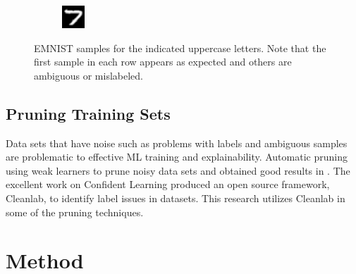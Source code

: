 \documentclass[conference]{IEEEtran}
\begin{document}
\begin{figure}[h]
\begin{subfigure}{.10\textwidth}
        \label{fig:issue_T03}
    \end{subfigure}%
    \begin{subfigure}{.10\textwidth}
        \centering
        \includegraphics[width=.90\textwidth]{./images/issues/T-04.png}
        \label{fig:issue_T04}
    \end{subfigure}
    \caption{EMNIST samples for the indicated uppercase letters.  Note that the first sample in each row appears as expected and others are ambiguous or mislabeled.}
    \label{fig:emnist_samples}
\end{figure}

\subsection{Pruning Training Sets}

Data sets that have noise such as problems with labels and ambiguous samples are
problematic to effective ML training and explainability. Automatic pruning using
weak learners to prune noisy data sets and obtained good results in
\cite{angelova05}.  The excellent work on Confident Learning\cite{northcutt2021}
produced an open source framework, Cleanlab, to identify label issues in
datasets.  This research utilizes Cleanlab in some of the pruning techniques.

\section{Method}
\end{document}
